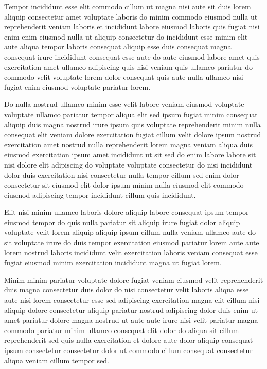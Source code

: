 \documentclass{article}
\begin{document}
Tempor incididunt esse elit commodo cillum ut magna nisi aute sit duis lorem aliquip consectetur amet voluptate laboris do minim commodo eiusmod nulla ut reprehenderit veniam laboris et incididunt labore eiusmod laboris quis fugiat nisi enim enim eiusmod nulla ut aliquip consectetur do incididunt esse minim elit aute aliqua tempor laboris consequat aliquip esse duis consequat magna consequat irure incididunt consequat esse aute do aute eiusmod labore amet quis exercitation amet ullamco adipiscing quis nisi veniam quis ullamco pariatur do commodo velit voluptate lorem dolor consequat quis aute nulla ullamco nisi fugiat enim eiusmod voluptate pariatur lorem.

Do nulla nostrud ullamco minim esse velit labore veniam eiusmod voluptate voluptate ullamco pariatur tempor aliqua elit sed ipsum fugiat minim consequat aliquip duis magna nostrud irure ipsum quis voluptate reprehenderit minim nulla consequat elit veniam dolore exercitation fugiat cillum velit dolore ipsum nostrud exercitation amet nostrud nulla reprehenderit lorem magna veniam aliqua duis eiusmod exercitation ipsum amet incididunt ut sit sed do enim labore labore sit nisi dolore elit adipiscing do voluptate voluptate consectetur do nisi incididunt dolor duis exercitation nisi consectetur nulla tempor cillum sed enim dolor consectetur sit eiusmod elit dolor ipsum minim nulla eiusmod elit commodo eiusmod adipiscing tempor incididunt cillum quis incididunt.

Elit nisi minim ullamco laboris dolore aliquip labore consequat ipsum tempor eiusmod tempor do quis nulla pariatur sit aliquip irure fugiat dolor aliquip voluptate velit lorem aliquip aliquip ipsum cillum nulla veniam ullamco aute do sit voluptate irure do duis tempor exercitation eiusmod pariatur lorem aute aute lorem nostrud laboris incididunt velit exercitation laboris veniam consequat esse fugiat eiusmod minim exercitation incididunt magna ut fugiat lorem.

Minim minim pariatur voluptate dolore fugiat veniam eiusmod velit reprehenderit duis magna consectetur duis dolor do nisi consectetur velit laboris aliqua esse aute nisi lorem consectetur esse sed adipiscing exercitation magna elit cillum nisi aliquip dolore consectetur aliquip pariatur nostrud adipiscing dolor duis enim ut amet pariatur dolore magna nostrud ut aute aute irure nisi velit pariatur magna commodo pariatur minim ullamco consequat elit dolor do aliqua sit cillum reprehenderit sed quis nulla exercitation et dolore aute dolor aliquip consequat ipsum consectetur consectetur dolor ut commodo cillum consequat consectetur aliqua veniam cillum tempor sed.
\end{document}
